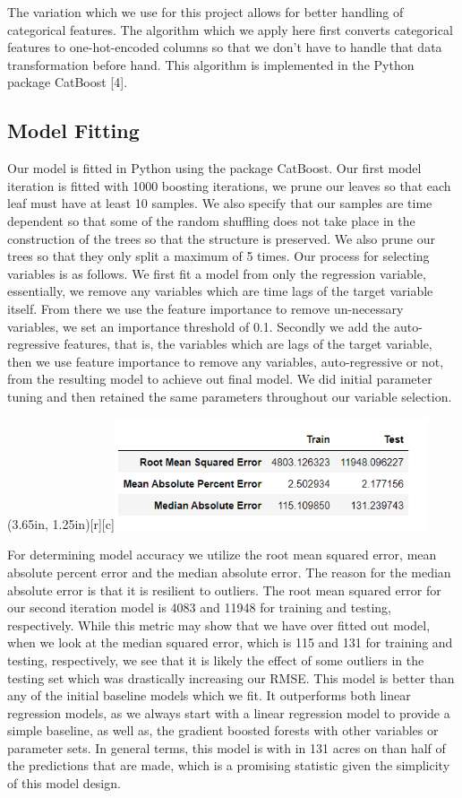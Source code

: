 \documentclass[12pt]{article}
\begin{document}
The variation which we use for this project allows for better handling of categorical features. The algorithm which we apply here first converts categorical features to one-hot-encoded columns so that we don't have to handle that data transformation before hand. This algorithm is implemented in the Python package CatBoost [4]. 

\subsection{\textrm{Model Fitting}}

Our model is fitted in Python using the package CatBoost. Our first model iteration is fitted with 1000 boosting iterations, we prune our leaves so that each leaf must have at least 10 samples. We also specify that our samples are time dependent so that some of the random shuffling does not take place in the construction of the trees so that the structure is preserved. We also prune our trees so that they only split a maximum of 5 times. Our process for selecting variables is as follows. We first fit a model from only the regression variable, essentially, we remove any variables which are time lags of the target variable itself. From there we use the feature importance to remove un-necessary variables, we set an importance threshold of 0.1. Secondly we add the auto-regressive features, that is, the variables which are lags of the target variable, then we use feature importance to remove any variables, auto-regressive or not, from the resulting model to achieve out final model. We did initial parameter tuning and then retained the same parameters throughout our variable selection. 

\parpic(3.65in, 1.25in)[r][c]{\includegraphics[width=3.65in]{./img/FinalModelMetrics.png}}

For determining model accuracy we utilize the root mean squared error, mean absolute percent error and the median absolute error. The reason for the median absolute error is that it is resilient to outliers. The root mean squared error for our second iteration model is 4083 and 11948 for training and testing, respectively. While this metric may show that we have over fitted out model, when we look at the median squared error, which is 115 and 131 for training and testing, respectively, we see that it is likely the effect of some outliers in the testing set which was drastically increasing our RMSE. This model is better than any of the initial baseline models which we fit. It outperforms both linear regression models, as we always start with a linear regression model to provide a simple baseline, as well as, the gradient boosted forests with other variables or parameter sets. In general terms, this model is with in 131 acres on than half of the predictions that are made, which is a promising statistic given the simplicity of this model design. 
\end{document}
